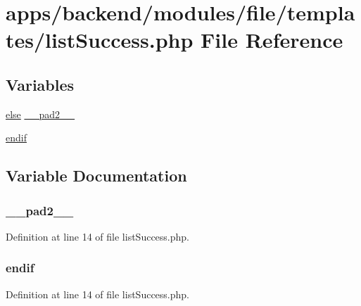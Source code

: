 \hypertarget{backend_2modules_2file_2templates_2list_success_8php}{\section{apps/backend/modules/file/templates/list\-Success.php File Reference}
\label{backend_2modules_2file_2templates_2list_success_8php}
}
\subsection*{Variables}
\begin{DoxyCompactItemize}
\item 
\hyperlink{live_2modules_2team_2templates_2management_success_8php_a0544c3fe466e421738dae463968b70ba}{else} \hyperlink{backend_2modules_2file_2templates_2list_success_8php_aed2d37b4e8da3f52103ae96ce9d26d82}{\-\_\-\-\_\-pad2\-\_\-\-\_\-}
\item 
\hyperlink{backend_2modules_2file_2templates_2list_success_8php_a82cd33ca97ff99f2fcc5e9c81d65251b}{endif}
\end{DoxyCompactItemize}


\subsection{Variable Documentation}
\hypertarget{backend_2modules_2file_2templates_2list_success_8php_aed2d37b4e8da3f52103ae96ce9d26d82}{
\subsubsection[{\-\_\-\-\_\-pad2\-\_\-\-\_\-}]{ \-\_\-\-\_\-pad2\-\_\-\-\_\-}}\label{backend_2modules_2file_2templates_2list_success_8php_aed2d37b4e8da3f52103ae96ce9d26d82}


Definition at line 14 of file list\-Success.\-php.

\hypertarget{backend_2modules_2file_2templates_2list_success_8php_a82cd33ca97ff99f2fcc5e9c81d65251b}{
\subsubsection[{endif}]{\setlength{\rightskip}{0pt plus 5cm}endif}}\label{backend_2modules_2file_2templates_2list_success_8php_a82cd33ca97ff99f2fcc5e9c81d65251b}


Definition at line 14 of file list\-Success.\-php.

